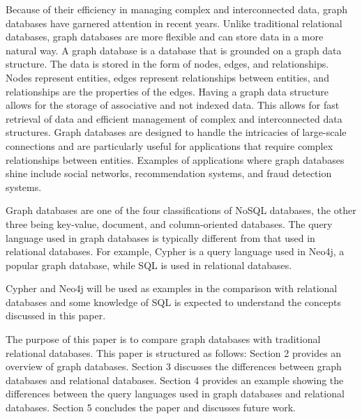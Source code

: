 
Because of their efficiency in managing complex and interconnected data, graph databases have garnered attention in recent years. Unlike traditional relational databases, graph databases are more flexible and can store data in a more natural way. A graph database is a database that is grounded on a graph data structure. The data is stored in the form of nodes, edges, and relationships. Nodes represent entities, edges represent relationships between entities, and relationships are the properties of the edges. Having a graph data structure allows for the storage of associative and not indexed data. This allows for fast retrieval of data and efficient management of complex and interconnected data structures. Graph databases are designed to handle the intricacies of large-scale connections and are particularly useful for applications that require complex relationships between entities. Examples of applications where graph databases shine include social networks, recommendation systems, and fraud detection systems. 

Graph databases are one of the four classifications of NoSQL databases, the other three being key-value, document, and column-oriented databases. The query language used in graph databases is typically different from that used in relational databases. For example, Cypher is a query language used in Neo4j, a popular graph database, while SQL is used in relational databases. 

Cypher and Neo4j will be used as examples in the comparison with relational databases and some knowledge of SQL is expected to understand the concepts discussed in this paper.


The purpose of this paper is to compare graph databases with traditional relational databases. This paper is structured as follows: Section 2 provides an overview of graph databases. Section 3 discusses the differences between graph databases and relational databases. Section 4 provides an example showing the differences between the query languages used in graph databases and relational databases. Section 5 concludes the paper and discusses future work.





